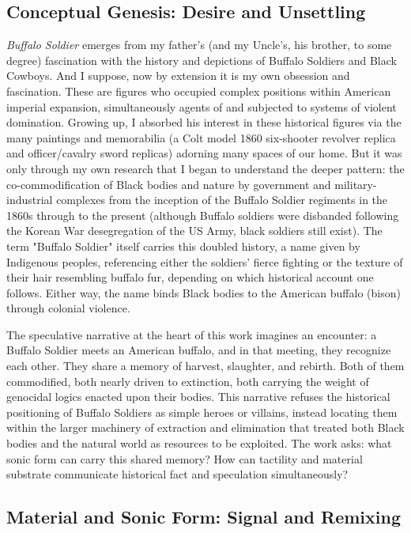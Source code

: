 \subsection{Conceptual Genesis: Desire and Unsettling}

\emph{Buffalo Soldier} emerges from my father's (and my Uncle's, his brother, to some degree) fascination with the history and depictions of Buffalo Soldiers and Black Cowboys. And I suppose, now  by extension it is my own obsession and fascination. These are figures who occupied complex positions within American imperial expansion, simultaneously agents of and subjected to systems of violent domination. Growing up, I absorbed his interest in these historical figures via the many paintings and memorabilia (a Colt model 1860 six-shooter revolver replica and officer/cavalry sword replicas) adorning many spaces of our home. But it was only through my own research that I began to understand the deeper pattern: the co-commodification of Black bodies and nature by government and military-industrial complexes from the inception of the Buffalo Soldier regiments in the 1860s through to the present (although Buffalo soldiers were disbanded following the Korean War desegregation of the US Army, black soldiers still exist). The term "Buffalo Soldier" itself carries this doubled history, a name given by Indigenous peoples, referencing either the soldiers' fierce fighting or the texture of their hair resembling buffalo fur, depending on which historical account one follows. Either way, the name binds Black bodies to the American buffalo (bison) through colonial violence.

The speculative narrative at the heart of this work imagines an encounter: a Buffalo Soldier meets an American buffalo, and in that meeting, they recognize each other. They share a memory of harvest, slaughter, and rebirth. Both of them commodified, both nearly driven to extinction, both carrying the weight of genocidal logics enacted upon their bodies. This narrative refuses the historical positioning of Buffalo Soldiers as simple heroes or villains, instead locating them within the larger machinery of extraction and elimination that treated both Black bodies and the natural world as resources to be exploited. The work asks: what sonic form can carry this shared memory? How can tactility and material substrate communicate historical fact and speculation simultaneously?

\subsection{Material and Sonic Form: Signal and Remixing}

